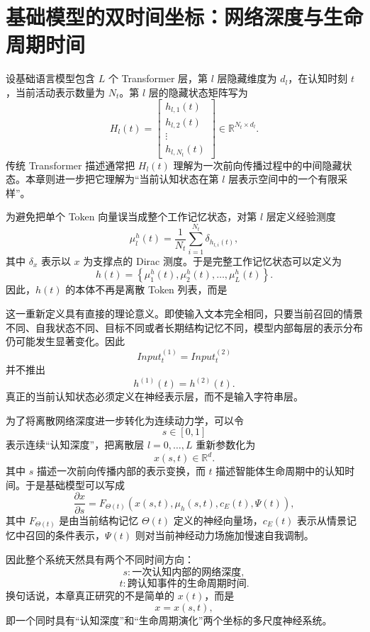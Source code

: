 \section{基础模型的双时间坐标：网络深度与生命周期时间}

设基础语言模型包含 $L$ 个 Transformer 层，第 $l$ 层隐藏维度为 $d_l$，在认知时刻 $t$，当前活动表示数量为 $N_t$。第 $l$ 层的隐藏状态矩阵写为
\[
H_l(t)
=
\begin{bmatrix}
h_{l,1}(t)\\
h_{l,2}(t)\\
\vdots\\
h_{l,N_t}(t)
\end{bmatrix}
\in
\mathbb{R}^{N_t\times d_l}.
\]
传统 Transformer 描述通常把 $H_l(t)$ 理解为一次前向传播过程中的中间隐藏状态。本章则进一步把它理解为“当前认知状态在第 $l$ 层表示空间中的一个有限采样”。

为避免把单个 Token 向量误当成整个工作记忆状态，对第 $l$ 层定义经验测度
\[
\mu_l^h(t)
=
\frac{1}{N_t}
\sum_{i=1}^{N_t}
\delta_{h_{l,i}(t)},
\]
其中 $\delta_x$ 表示以 $x$ 为支撑点的 Dirac 测度。于是完整工作记忆状态可以定义为
\[
h(t)
=
\left\{
\mu_1^h(t),
\mu_2^h(t),
\ldots,
\mu_L^h(t)
\right\}.
\]
因此，$h(t)$ 的本体不再是离散 Token 列表，而是
\begin{statementbox}
\centering
{}
\end{statementbox}

这一重新定义具有直接的理论意义。即使输入文本完全相同，只要当前召回的情景不同、自我状态不同、目标不同或者长期结构记忆不同，模型内部每层的表示分布仍可能发生显著变化。因此
\[
Input_t^{(1)}=Input_t^{(2)}
\]
并不推出
\[
h^{(1)}(t)=h^{(2)}(t).
\]
真正的当前认知状态必须定义在神经表示层，而不是输入字符串层。

为了将离散网络深度进一步转化为连续动力学，可以令
\[
s\in[0,1]
\]
表示连续“认知深度”，把离散层 $l=0,\ldots,L$ 重新参数化为
\[
x(s,t)\in\mathbb{R}^{d}.
\]
其中 $s$ 描述一次前向传播内部的表示变换，而 $t$ 描述智能体生命周期中的认知时间。于是基础模型可以写成
\[
\frac{\partial x}{\partial s}
=
F_{\Theta(t)}
\left(
x(s,t),
\mu_h(s,t),
c_E(t),
\Psi(t)
\right),
\]
其中 $F_{\Theta(t)}$ 是由当前结构记忆 $\Theta(t)$ 定义的神经向量场，$c_E(t)$ 表示从情景记忆中召回的条件表示，$\Psi(t)$ 则对当前神经动力场施加慢速自我调制。

因此整个系统天然具有两个不同时间方向：
\[
s:
\text{一次认知内部的网络深度},
\]
\[
t:
\text{跨认知事件的生命周期时间}.
\]
换句话说，本章真正研究的不是简单的 $x(t)$，而是
\[
\boxed{
x=x(s,t),
}
\]
即一个同时具有“认知深度”和“生命周期演化”两个坐标的多尺度神经系统。

